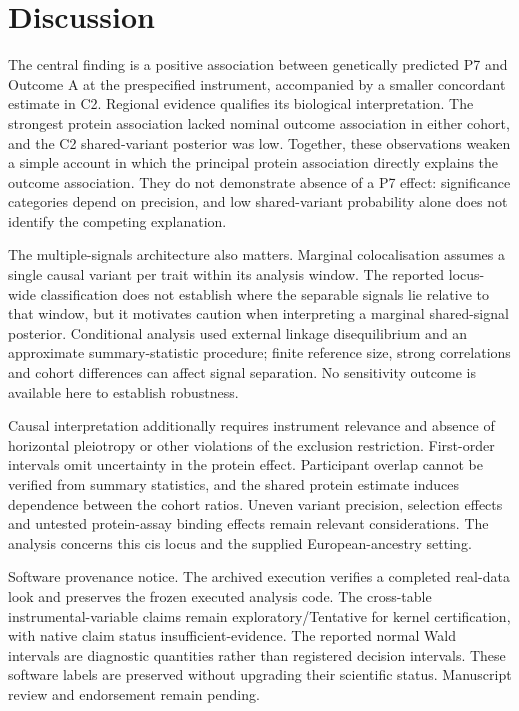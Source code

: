 \documentclass[10pt,a4paper]{article}
\begin{document}
\section*{Discussion}
The central finding is a positive association between genetically predicted P7 and Outcome A at the prespecified instrument, accompanied by a smaller concordant estimate in C2. Regional evidence qualifies its biological interpretation. The strongest protein association lacked nominal outcome association in either cohort, and the C2 shared-variant posterior was low. Together, these observations weaken a simple account in which the principal protein association directly explains the outcome association. They do not demonstrate absence of a P7 effect: significance categories depend on precision, and low shared-variant probability alone does not identify the competing explanation.
\par
The multiple-signals architecture also matters. Marginal colocalisation assumes a single causal variant per trait within its analysis window. The reported locus-wide classification does not establish where the separable signals lie relative to that window, but it motivates caution when interpreting a marginal shared-signal posterior. Conditional analysis used external linkage disequilibrium and an approximate summary-statistic procedure; finite reference size, strong correlations and cohort differences can affect signal separation. No sensitivity outcome is available here to establish robustness.
\par
Causal interpretation additionally requires instrument relevance and absence of horizontal pleiotropy or other violations of the exclusion restriction. First-order intervals omit uncertainty in the protein effect. Participant overlap cannot be verified from summary statistics, and the shared protein estimate induces dependence between the cohort ratios. Uneven variant precision, selection effects and untested protein-assay binding effects remain relevant considerations. The analysis concerns this cis locus and the supplied European-ancestry setting.
\par
Software provenance notice. The archived execution verifies a completed real-data look and preserves the frozen executed analysis code. The cross-table instrumental-variable claims remain exploratory/Tentative for kernel certification, with native claim status insufficient-evidence. The reported normal Wald intervals are diagnostic quantities rather than registered decision intervals. These software labels are preserved without upgrading their scientific status. Manuscript review and endorsement remain pending.
\par
\end{document}
